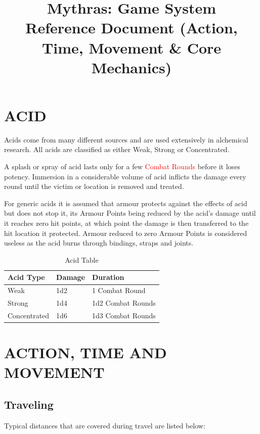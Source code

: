 \documentclass[10pt]{article}
\title{Mythras: Game System \\ \large Reference Document (Action, Time, Movement \& Core Mechanics)}
\author{}
\date{}
\begin{document}
\maketitle

\tableofcontents
\newpage

\section{ACID}
\label{sec:acid}

Acids come from many different sources and are used extensively in alchemical research. All acids are  classified as either Weak, Strong or Concentrated. 

A splash or spray of acid lasts only for a few \textcolor{red}{Combat Rounds} before it loses potency. Immersion in a considerable volume of acid inflicts the damage every round until the victim or location is removed and treated.

For generic acids it is assumed that armour protects against the effects of acid but does not stop it, its Armour Points being reduced by the acid's damage until it reaches zero hit points, at which point the damage is then transferred to the hit location it protected. Armour reduced to zero Armour Points is considered useless as the acid burns through bindings, straps and joints.

\begin{table}[h]
\centering
\caption{Acid Table}
\label{tab:acid}
\begin{tabular}{lll}
\toprule
\textbf{Acid Type} & \textbf{Damage} & \textbf{Duration} \\
\midrule
Weak    & 1d2 & 1 Combat Round \\
Strong  & 1d4 & 1d2 Combat Rounds \\
Concentrated & 1d6 & 1d3 Combat Rounds \\
\bottomrule
\end{tabular}
\end{table}


\section{ACTION, TIME AND MOVEMENT}


\subsection{Traveling}
Typical distances that are covered during travel are listed below:
\end{document}

